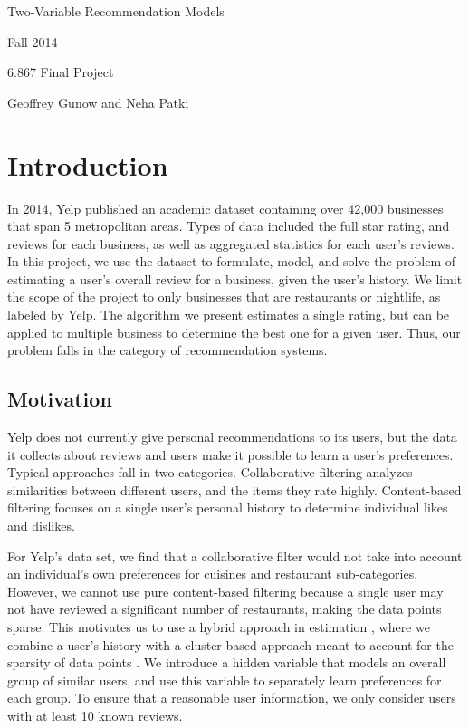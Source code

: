 \documentclass[11pt]{article}
\author{6.867 Homework 2 and 3}
\begin{document}
\noindent\centerline{\LARGE{Two-Variable Recommendation Models}}
\noindent\centerline{}
\noindent\centerline{}
\noindent\centerline{Fall 2014}
\noindent\centerline{6.867 Final Project}
\noindent\centerline{Geoffrey Gunow and Neha Patki}

\section{Introduction}
In 2014, Yelp published an academic dataset containing over 42,000 businesses that span 5 metropolitan areas. Types of data included the full star rating, and reviews for each business, as well as aggregated statistics for each user's reviews. In this project, we use the dataset to formulate, model, and solve the problem of estimating a user's overall review for a business, given the user's history. We limit the scope of the project to only businesses that are restaurants or nightlife, as labeled by Yelp. The algorithm we present estimates a single rating, but can be applied to multiple business to determine the best one for a given user. Thus, our problem falls in the category of recommendation systems.

\subsection{Motivation}
Yelp does not currently give personal recommendations to its users, but the data it collects about reviews and users make it possible to learn a user's preferences. Typical approaches fall in two categories. Collaborative filtering analyzes similarities between different users, and the items they rate highly. Content-based filtering focuses on a single user's personal history to determine individual likes and dislikes.

For Yelp's data set, we find that a collaborative filter would not take into account an individual's own preferences for cuisines and restaurant sub-categories. However, we cannot use pure content-based filtering because a single user may not have reviewed a significant number of restaurants, making the data points sparse. This motivates us to use a hybrid approach in estimation \cite{hybrid}, where we combine a user's history with a cluster-based approach meant to account for the sparsity of data points \cite{Guyon}. We introduce a hidden variable that models an overall group of similar users, and use this variable to separately learn preferences for each group. To ensure that a reasonable user information, we only consider users with at least 10 known reviews.
\end{document}
